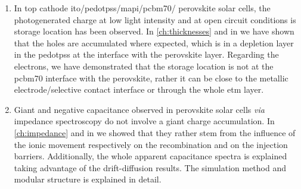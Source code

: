 \begin{enumerate}
	\item In top cathode \gls{ito}\-/\gls{pedotpss}\-/\gls{mapi}\-/\gls{pcbm70}\-/ perovskite solar cells, the photogenerated charge at low light intensity and at open circuit conditions is storage location has been observed.
	In \cref{ch:thicknesses} and in \cite{Gelmetti2017} we have shown that the holes are accumulated where expected, which is in a depletion layer in the \gls{pedotpss} at the interface with the perovskite layer.
	Regarding the electrons, we have demonstrated that the storage location is not at the \gls{pcbm70} interface with the perovskite, rather it can be close to the metallic electrode\-/selective contact interface or through the whole \gls{etm} layer.
	
	\item Giant and negative capacitance observed in perovskite solar cells \textsl{via} impedance spectroscopy do not involve a giant charge accumulation.
	In \cref{ch:impedance} and in \cite{Moia2019} we showed that they rather stem from the influence of the ionic movement respectively on the recombination and on the injection barriers.
	Additionally, the whole apparent capacitance spectra is explained taking advantage of the drift\hyp{}diffusion results. 
	The simulation method and modular structure is explained in detail.
\end{enumerate}